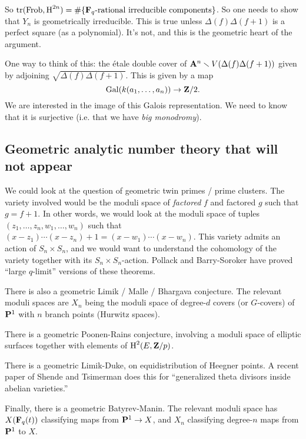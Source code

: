 So $\operatorname{tr}(\operatorname{Frob},\operatorname{H}^{2n}) = \#\{\mathbf{F}_q\text{-rational irreducible components}\}$. 
So one needs to show that $Y_n$ is geometrically irreducible. This is true 
unless $\Delta(f)\Delta(f+1)$ is a perfect square (as a polynomial). It's not, 
and this is the geometric heart of the argument. 

One way to think of this: the \'etale double cover of 
$\mathbf{A}^n\smallsetminus V(\Delta(f)\Delta(f+1))$ given by adjoining 
$\sqrt{\Delta(f)\Delta(f+1)}$. This is given by a map 
\[
  \operatorname{Gal}(k(a_1,\dots,a_n)) \to \mathbf{Z}/2 .
\]
We are interested in the image of this Galois representation. We need to know 
that it is surjective (i.e. that we have \emph{big monodromy}). 





\subsection{Geometric analytic number theory that will not appear}

We could look at the question of geometric twin primes / prime clusters. The 
variety involved would be the moduli space of \emph{factored} $f$ and factored 
$g$ such that $g=f+1$. In other words, we would look at the moduli space of 
tuples $(z_1,\dots,z_n,w_1,\dots,w_n)$ such that 
$(x-z_1)\dotsm (x-z_n) + 1 = (x-w_1)\dotsm (x-w_n)$. This variety admits an 
action of $S_n\times S_n$, and we would want to understand the cohomology of 
the variety together with its $S_n\times S_n$-action. Pollack and Barry-Soroker 
have proved ``large $q$-limit'' versions of these theorems. 

There is also a geometric Limik / Malle / Bhargava conjecture. The relevant 
moduli spaces are $X_n$ being the moduli space of degree-$d$ covers (or 
$G$-covers) of $\mathbf{P}^1$ with $n$ branch points (Hurwitz spaces). 

There is a geometric Poonen-Rains conjecture, involving a moduli space of 
elliptic surfaces together with elements of $\operatorname{H}^2(E,\mathbf{Z}/p)$. 

There is a geometric Limik-Duke, on equidistribution of Heegner points. A 
recent paper of Shende and Tsimerman does this for ``generalized theta divisors 
inside abelian varieties.'' 

Finally, there is a geometric Batyrev-Manin. The relevant moduli space has 
$X(\mathbf{F}_q(t))$ classifying maps from $\mathbf{P}^1\to X$, and $X_n$ classifying 
degree-$n$ maps from $\mathbf{P}^1$ to $X$. 





